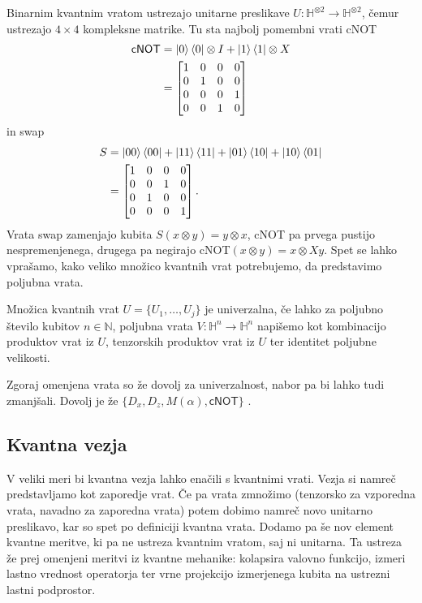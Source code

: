 \documentclass[mat1]{fmfdelo}
\newcommand{\N}{\mathbb N}
\newcommand{\Hb}{\mathbb H}
\begin{document}
Binarnim kvantnim vratom ustrezajo unitarne preslikave \(U:\Hb^{\otimes 2}\to \Hb^{\otimes 2}\), čemur ustrezajo \(4\times 4\) kompleksne matrike. Tu sta najbolj pomembni vrati \textsf{cNOT} 
\begin{align*}
    \mathsf{cNOT}&=\ket0\bra0\otimes I + \ket1\bra1\otimes X \\
    &=\begin{bmatrix}
        1&0&0&0\\
        0&1&0&0\\
        0&0&0&1\\
        0&0&1&0
    \end{bmatrix}
\end{align*}
in \textsf{swap}
\begin{align*}
    S &= \ket{00}\bra{00}+\ket{11}\bra{11}+\ket{01}\bra{10}+\ket{10}\bra{01}\\
    &=\begin{bmatrix}
        1&0&0&0\\
        0&0&1&0\\
        0&1&0&0\\
        0&0&0&1
    \end{bmatrix}.
\end{align*}
Vrata \textsf{swap} zamenjajo kubita \(S(x\otimes y)=y\otimes x\), \textsf{cNOT} pa prvega pustijo nespremenjenega, drugega pa negirajo \textsf{cNOT}\((x\otimes y)=x\otimes Xy\). Spet se lahko vprašamo, kako veliko množico kvantnih vrat potrebujemo, da predstavimo poljubna vrata.
\begin{definicija}
    Množica kvantnih vrat \(U=\{U_1,\ldots,U_j\}\) je univerzalna, če lahko za poljubno število kubitov \(n\in\N\), poljubna vrata \(V:\Hb^n\to \Hb^n\) napišemo kot kombinacijo produktov vrat iz \(U\), tenzorskih produktov vrat iz \(U\) ter identitet poljubne velikosti.
\end{definicija}
Zgoraj omenjena vrata so že dovolj za univerzalnost, nabor pa bi lahko tudi zmanjšali. Dovolj je že \(\{D_x,D_z, M(\alpha), \mathsf{cNOT}\}\) \cite[Lema 5.26]{mathforqm}.
\subsection{Kvantna vezja}
V veliki meri bi kvantna vezja lahko enačili s kvantnimi vrati. Vezja si namreč predstavljamo kot zaporedje vrat. Če pa vrata zmnožimo (tenzorsko za vzporedna vrata, navadno za zaporedna vrata) potem dobimo namreč novo unitarno preslikavo, kar so spet po definiciji kvantna vrata. Dodamo pa še nov element kvantne meritve, ki pa ne ustreza kvantnim vratom, saj ni unitarna. Ta ustreza že prej omenjeni meritvi iz kvantne mehanike: kolapsira valovno funkcijo, izmeri lastno vrednost operatorja ter vrne projekcijo izmerjenega kubita na ustrezni lastni podprostor.
\end{document}
